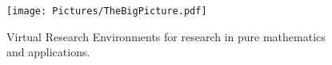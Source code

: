 \begin{figure}
  \centerline{\texttt{[image: Pictures/TheBigPicture.pdf]}}
  \caption{Virtual Research Environments for research in pure
    mathematics and applications.}
  \label{fig:thebigpicture}
\end{figure}

